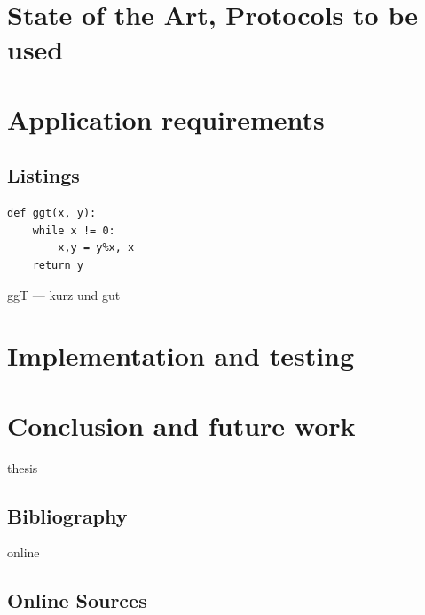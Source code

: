 \documentclass[11pt,a4paper]{report}
\begin{document}
\chapter{State of the Art, Protocols to be used} \label{ch:soa}


\chapter{Application requirements} \label{ch:appreq}


\section{Listings} \label{sec:listings}

\begin{listing}[htbp]
\begin{lstlisting}
def ggt(x, y):
    while x != 0:
        x,y = y%x, x
    return y
\end{lstlisting}
\caption{ggT --- kurz und gut}
\label{code:ggt}
\end{listing}


\chapter{Implementation and testing} \label{ch:impl}
\newpage


\chapter{Conclusion and future work} \label{ch:conclusion}

\newpage


\begin{btSect}{thesis} %
\section*{Bibliography}
\btPrintCited
\end{btSect}
\begin{btSect}{online}
\section*{Online Sources}
\btPrintCited
\end{btSect}
\end{document}
